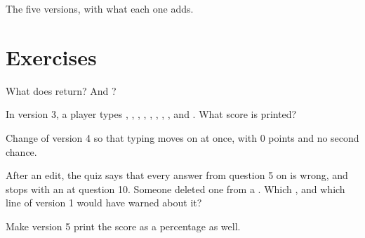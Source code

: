 \begin{omfigure}

{\small The five versions, with what each one adds.}
\end{omfigure}

\section{Exercises}

\begin{exercise}[$\star$]\label{exo:g7:project-quiz-game:1}
What does  return? And
?
\end{exercise}

\begin{exercise}[$\star$]\label{exo:g7:project-quiz-game:2}
In version 3, a player types , , ,
, , , , ,
 and . What score is printed?
\end{exercise}

\begin{exercise}[$\star$]\label{exo:g7:project-quiz-game:3}
Change  of version 4 so that typing  moves on at once,
with 0 points and no second chance.
\end{exercise}

\begin{exercise}[$\star$]\label{exo:g7:project-quiz-game:4}
After an edit, the quiz says that every answer from question 5 on is wrong,
and stops with an  at question 10. Someone deleted one 
from a . Which , and which line of version 1 would have warned about
it?
\end{exercise}

\begin{exercise}[$\star\star$]\label{exo:g7:project-quiz-game:5}
Make version 5 print the score as a percentage as well.
\end{exercise}


